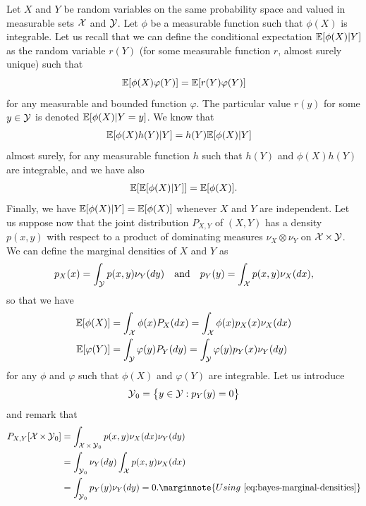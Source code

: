 Let $X$ and $Y$ be random variables on the same probability space and valued in measurable sets $\operatorname{{\mathcal X}}$ and $\operatorname{{\mathcal Y}}$.
Let $\phi$ be a measurable function such that $\phi(X)$ is integrable. 
Let us recall that we can define the conditional expectation $\mathbb E [\phi(X) | Y]$ as the random variable $r(Y)$ (for some measurable function $r$, almost surely unique) such that
\begin{equation}
	\mathbb E[\phi(X) \varphi(Y)] = \mathbb E[ r(Y) \varphi(Y)]
\end{equation}
for any measurable and bounded function $\varphi$.
The particular value $r(y)$ for some $y \in \operatorname{{\mathcal Y}}$ is denoted $\mathbb E[\phi(X) | Y = y]$. 
We know that
\begin{align*}
	\mathbb E[\phi(X) h(Y) | Y] &= h(Y) \mathbb E[ \phi(X) | Y]
\end{align*}
almost surely, for any measurable function $h$ such that $h(Y)$ and $\phi(X) h(Y)$ are integrable, and we have also
\begin{align}
	\mathbb E [\mathbb E[ \phi(X) | Y]] = \mathbb E[\phi(X)].
\end{align}
Finally, we have $\mathbb E[\phi(X) | Y] = \mathbb E[\phi(X)]$ whenever $X$ and $Y$ are independent.
Let us suppose now that the joint distribution $P_{X, Y}$ of $(X, Y)$ has a density $p(x, y)$ with respect to a product of dominating measures $\nu_X \otimes \nu_Y$ on $\operatorname{{\mathcal X}} \times \operatorname{{\mathcal Y}}$.
We can define the marginal densities of $X$ and $Y$ as
\begin{equation}
	\label{eq:bayes-marginal-densities}
	p_X(x) = \int_{\operatorname{{\mathcal Y}}} p(x, y) \nu_Y(d y) \quad \text{and} \quad
	p_Y(y) = \int_{\operatorname{{\mathcal X}}} p(x, y) \nu_X(d x),
\end{equation}
so that we have
\begin{align*}
	\mathbb E[\phi(X)] &= \int_{\operatorname{{\mathcal X}}} \phi(x) P_X(dx) = \int_{\operatorname{{\mathcal X}}} \phi(x) p_X(x) \nu_X(dx) \\ 
	\mathbb E[\varphi(Y)] &= \int_{\operatorname{{\mathcal Y}}} \varphi(y) P_Y(dy) = \int_{\operatorname{{\mathcal Y}}} \varphi(y) p_Y(x) \nu_Y(dy)
\end{align*}
for any $\phi$ and $\varphi$ such that $\phi(X)$ and $\varphi(Y)$ are integrable. 
Let us introduce 
\begin{equation*}
	\operatorname{{\mathcal Y}}_0 = \big\{ y \in \operatorname{{\mathcal Y}} : p_Y(y) = 0 \big\}
\end{equation*}
and remark that
\begin{align*}
	P_{X, Y} [ \cX \times \cY_0 ] 
	&= \int_{\cX \times \cY_0} p(x, y) \nu_X(dx) \nu_Y(dy) \\
	&= \int_{\cY_0} \nu_Y(dy) \int_{\cX} p(x, y) \nu_X (dx) \\
	&= \int_{\cY_0} p_Y(y) \nu_Y(dy) = 0.
	\marginnote{Using~\eqref{eq:bayes-marginal-densities}}
\end{align*}
